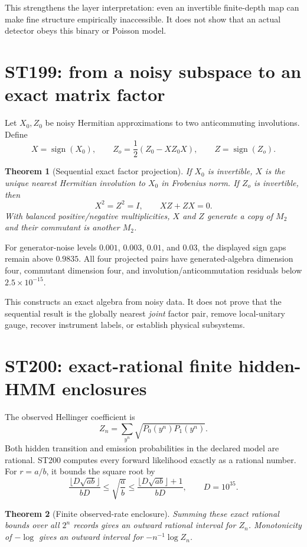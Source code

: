 \documentclass[11pt,a4paper]{article}
\newtheorem{theorem}{Theorem}[section]
\begin{document}
This strengthens the layer interpretation: even an invertible finite-depth map can make fine structure empirically inaccessible. It does not show that an actual detector obeys this binary or Poisson model.

\section{ST199: from a noisy subspace to an exact matrix factor}

Let $X_0,Z_0$ be noisy Hermitian approximations to two anticommuting involutions. Define
\[
X=\operatorname{sign}(X_0),\qquad
Z_o=\frac12(Z_0-XZ_0X),\qquad
Z=\operatorname{sign}(Z_o).
\]

\begin{theorem}[Sequential exact factor projection]
If $X_0$ is invertible, $X$ is the unique nearest Hermitian involution to $X_0$ in Frobenius norm. If $Z_o$ is invertible, then
\[
X^2=Z^2=I,\qquad XZ+ZX=0.
\]
With balanced positive/negative multiplicities, $X$ and $Z$ generate a copy of $M_2$ and their commutant is another $M_2$.
\end{theorem}

For generator-noise levels $0.001$, $0.003$, $0.01$, and $0.03$, the displayed sign gaps remain above $0.9835$. All four projected pairs have generated-algebra dimension four, commutant dimension four, and involution/anticommutation residuals below $2.5\times10^{-15}$.

This constructs an exact algebra from noisy data. It does not prove that the sequential result is the globally nearest \emph{joint} factor pair, remove local-unitary gauge, recover instrument labels, or establish physical subsystems.

\section{ST200: exact-rational finite hidden-HMM enclosures}

The observed Hellinger coefficient is
\[
Z_n=\sum_{y^n}\sqrt{P_0(y^n)P_1(y^n)}.
\]
Both hidden transition and emission probabilities in the declared model are rational. ST200 computes every forward likelihood exactly as a rational number. For $r=a/b$, it bounds the square root by
\[
\frac{\lfloor D\sqrt{ab}\rfloor}{bD}
\le\sqrt{\frac ab}\le
\frac{\lfloor D\sqrt{ab}\rfloor+1}{bD},
\qquad D=10^{35}.
\]

\begin{theorem}[Finite observed-rate enclosure]
Summing these exact rational bounds over all $2^n$ records gives an outward rational interval for $Z_n$. Monotonicity of $-\log$ gives an outward interval for $-n^{-1}\log Z_n$.
\end{theorem}
\end{document}
